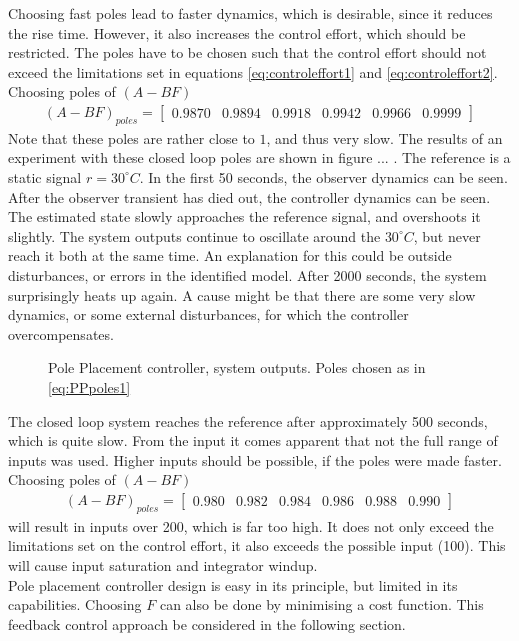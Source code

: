 Choosing fast poles lead to faster dynamics, which is desirable, since it reduces the rise time. However, it also increases the control effort, which should be restricted. The poles have to be chosen such that the control effort should not exceed the limitations set in equations \ref{eq:controleffort1} and \ref{eq:controleffort2}. Choosing poles of $(A-BF)$
\begin{align}
    (A-BF)_{poles} = \begin{bmatrix} 0.9870 & 0.9894 & 0.9918 & 0.9942 & 0.9966 & 0.9999 \end{bmatrix} \label{eq:PPpoles1}
\end{align}
Note that these poles are rather close to $1$, and thus very slow. The results of an experiment with these closed loop poles are shown in figure ... . The reference is a static signal $r = 30^{\circ}C$. In the first 50 seconds, the observer dynamics can be seen. After the observer transient has died out, the controller dynamics can be seen. The estimated state slowly approaches the reference signal, and overshoots it slightly. The system outputs continue to oscillate around the $30^{\circ}C$, but never reach it both at the same time. An explanation for this could be outside disturbances, or errors in the identified model. After 2000 seconds, the system surprisingly heats up again. A cause might be that there are some very slow dynamics, or some external disturbances, for which the controller overcompensates.
\begin{figure}
    \centering
    
    \caption{Pole Placement controller, system outputs. Poles chosen as in \ref{eq:PPpoles1}}
    \label{fig:PPexp1}
\end{figure}
The closed loop system reaches the reference after approximately 500 seconds, which is quite slow. From the input it comes apparent that not the full range of inputs was used. Higher inputs should be possible, if the poles were made faster. Choosing poles of $(A-BF)$
\begin{align}
    (A-BF)_{poles} = \begin{bmatrix} 0.980 & 0.982 & 0.984 & 0.986 & 0.988 & 0.990 \end{bmatrix} \nonumber
\end{align}
will result in inputs over 200, which is far too high. It does not only exceed the limitations set on the control effort, it also exceeds the possible input (100). This will cause input saturation and integrator windup.\\
Pole placement controller design is easy in its principle, but limited in its capabilities. Choosing $F$ can also be done by minimising a cost function. This feedback control approach be considered in the following section.
